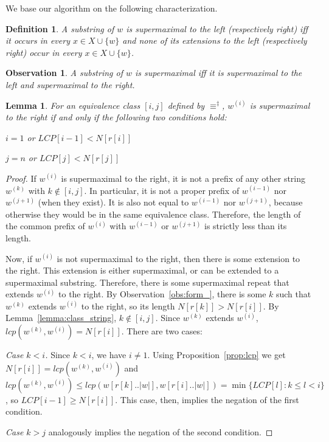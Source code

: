 \documentclass[submission]{dmtcs}
\newcommand\+[1]{\mathcal{#1}}
\newtheorem{observation}[theorem]{Observation}
\newtheorem{definition}[theorem]{Definition}
\newtheorem{lemma}[theorem]{Lemma}
\newenvironment{my_enumerate}{\begin{enumerate}
  \setlength{\itemsep}{1pt}
  \setlength{\parskip}{0pt}
  \setlength{\parsep}{0pt}}{\end{enumerate}}
\begin{document}
\noindent
We base our algorithm on the 
following characterization.

\begin{definition} \label{def:_maximal_left_right}
A substring of $w$ is supermaximal to the left (respectively right) 
iff it occurs in every $x\in X \cup\{w\}$ and none of its extensions 
to the left (respectively right) occur in every
$x\in X \cup\{w\}$.  
\end{definition}

\begin{observation}
A substring of $w$ is  supermaximal iff it is supermaximal to the left and
 supermaximal to the right.
\end{observation}

\begin{lemma}\label{lemma:maxright}
For an equivalence class $[i,j]$ defined by $\equiv^\ddag$,
$w^{(i)}$ is supermaximal to the right if and only if
the following two conditions hold:
\begin{my_enumerate}

\item $i = 1$  or $LCP[i-1] < N[r[i]]$


\item $j = n$ or $LCP[j] < N[r[j]]$
\end{my_enumerate}
\end{lemma}

\begin{proof}
If $w^{(i)}$ is supermaximal to the right, 
it is not a prefix of any other string $w^{(k)}$ with 
$k \not\in [i,j]$. In particular, 
it is not a proper prefix of $w^{(i-1)}$  nor $w^{(j+1)}$ (when they exist).
It is also not equal to $w^{(i-1)}$  nor $w^{(j+1)}$, because otherwise they
would be in the same equivalence class. Therefore, the length of the common
prefix of $w^{(i)}$ with $w^{(i-1)}$ or $w^{(j+1)}$ is strictly less than its
length.

Now, if $w^{(i)}$ is not supermaximal to the right, then there is some
extension to the right. This extension is either supermaximal, or can be
extended to a supermaximal substring. Therefore, there is some supermaximal
repeat that extends $w^{(i)}$ to the right. By Observation~\ref{obs:form_},
there is some $k$ such that $w^{(k)}$ extends $w^{(i)}$ to the right, so its
length $N[r[k]] > N[r[i]]$. By Lemma~\ref{lemma:class_string},
$k \not\in [i,j]$. 
Since $w^{(k)}$ extends $w^{(i)}$, $lcp(w^{(k)}, w^{(i)}) = N[r[i]]$.
There are two cases:

{\em Case $k<i$.}  Since $k<i$, we have $i \neq 1$. Using
Proposition~\ref{prop:lcp} we get 
$N[r[i]] = lcp(w^{(k)}, w^{(i)})$ and $lcp(w^{(k)}, w^{(i)}) \leq lcp(w[r[k]..|w|], w[r[i]..|w|]) = \min\{LCP[l] : k\leq l < i\}$,
 so $LCP[i-1] \geq N[r[i]]$.
This case, then, implies the negation of the first condition.

{\em Case $k>j$} analogously implies the negation of the second condition.
\end{proof}
\end{document}
